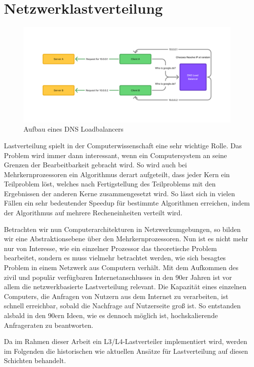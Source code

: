 \chapter{Netzwerklastverteilung}
\begin{figure}
    \centering
    \includegraphics[width=1.1\linewidth]{images/DNS Loadbalancer(1).png}
    \caption{Aufbau eines DNS Loadbalancers}
    \label{fig:enter-label}
\end{figure}
Lastverteilung spielt in der Computerwissenschaft eine sehr wichtige Rolle. Das Problem wird immer dann interessant, wenn ein Computersystem an seine Grenzen der Bearbeitbarkeit gebracht wird. So wird auch bei Mehrkernprozessoren ein Algorithmus derart aufgeteilt, dass jeder Kern ein Teilproblem löst, welches nach Fertigstellung des Teilproblems mit den Ergebnissen der anderen Kerne zusammengesetzt wird. So lässt sich in vielen Fällen ein sehr bedeutender Speedup für bestimmte Algorithmen erreichen, indem der Algorithmus auf mehrere Recheneinheiten verteilt wird. \cite{lbtheory}

Betrachten wir nun Computerarchitekturen in Netzwerkumgebungen, so bilden wir eine Abstraktionsebene über den Mehrkernprozessoren. Nun ist es nicht mehr nur von Interesse, wie ein einzelner Prozessor das theoretische Problem bearbeitet, sondern es muss vielmehr betrachtet werden, wie sich besagtes Problem in einem Netzwerk aus Computern verhält. Mit dem Aufkommen des zivil und populär verfügbaren Internetanschlusses in den 90er Jahren ist vor allem die netzwerkbasierte Lastverteilung relevant. Die Kapazität eines einzelnen Computers, die Anfragen von Nutzern aus dem Internet zu verarbeiten, ist schnell erreichbar, sobald die Nachfrage auf Nutzerseite groß ist. So entstanden alsbald in den 90ern Ideen, wie es dennoch möglich ist, hochskalierende Anfrageraten zu beantworten. 

Da im Rahmen dieser Arbeit ein L3/L4-Lastverteiler implementiert wird, werden im Folgenden die historischen wie aktuellen Ansätze für Lastverteilung auf diesen Schichten behandelt.

